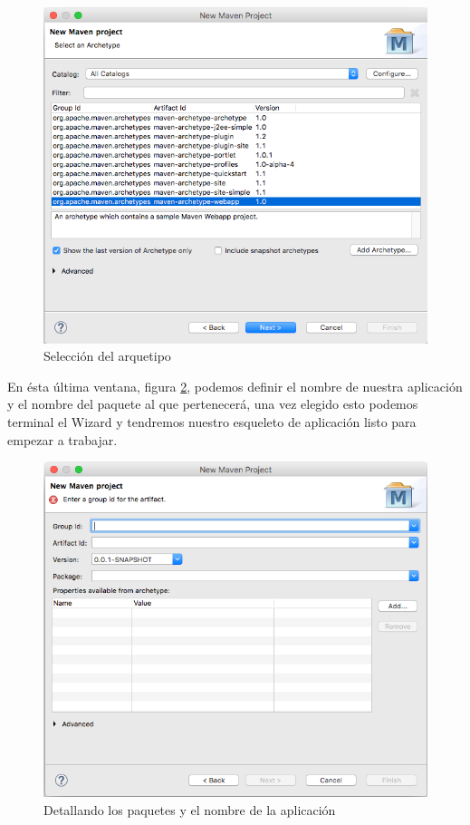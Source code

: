 \documentclass[12pt,a4paper]{article}
\begin{document}
         \begin{figure}[h]
            \centering
            \includegraphics[scale=0.4]{03_nuevo_proyecto}
            \caption{Selecci\'on del arquetipo}
            \label{03_nuevo_proyecto}
        \end{figure}
        \par
        En \'esta \'ultima ventana, figura \ref{04_nuevo_proyecto}, podemos definir el nombre de nuestra aplicaci\'on y el nombre del paquete al que pertenecer\'a, una vez elegido esto podemos terminal el Wizard y tendremos nuestro esqueleto de aplicaci\'on listo para empezar a trabajar.
        \begin{figure}[h]
            \centering
            \includegraphics[scale=0.4]{04_nuevo_proyecto}
            \caption{Detallando los paquetes y el nombre de la aplicaci\'on}
            \label{04_nuevo_proyecto}
        \end{figure}
        \newpage
        
\end{document}
